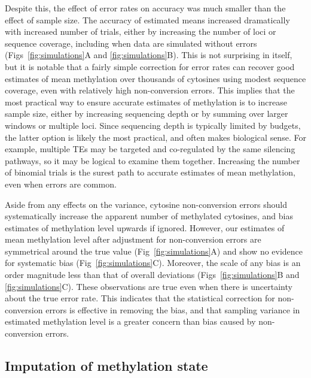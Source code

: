\documentclass[10pt,letterpaper,draft]{article}
\begin{document}
Despite this, the effect of error rates on accuracy was much smaller than the effect of sample size.
The accuracy of estimated means increased dramatically with increased number of trials, either by increasing the number of loci or sequence coverage, including when data are simulated without errors (Figs~\ref{fig:simulations}A and \ref{fig:simulations}B).
This is not surprising in itself, but it is notable that a fairly simple correction for error rates can recover good estimates of mean methylation over thousands of cytosines using modest sequence coverage, even with relatively high non-conversion errors.
This implies that the most practical way to ensure accurate estimates of methylation is to increase sample size, either by increasing sequencing depth or by summing over larger windows or multiple loci.
Since sequencing depth is typically limited by budgets, the latter option is likely the most practical, and often makes biological sense.
For example, multiple TEs may be targeted and co-regulated by the same silencing pathways, so it may be logical to examine them together.
Increasing the number of binomial trials is the surest path to accurate estimates of mean methylation, even when errors are common.

Aside from any effects on the variance, cytosine non-conversion errors should systematically increase the apparent number of methylated cytosines, and bias estimates of methylation level upwards if ignored.
However, our estimates of mean methylation level after adjustment for non-conversion errors are symmetrical around the true value (Fig~\ref{fig:simulations}A) and show no evidence for systematic bias (Fig~\ref{fig:simulations}C).
Moreover, the scale of any bias is an order magnitude less than that of overall deviations (Figs~\ref{fig:simulations}B and \ref{fig:simulations}C).
These observations are true even when there is uncertainty about the true error rate.
This indicates that the statistical correction for non-conversion errors is effective in removing the bias, and that sampling variance in estimated methylation level is a greater concern than bias caused by non-conversion errors.

\subsection*{Imputation of methylation state}
\end{document}
